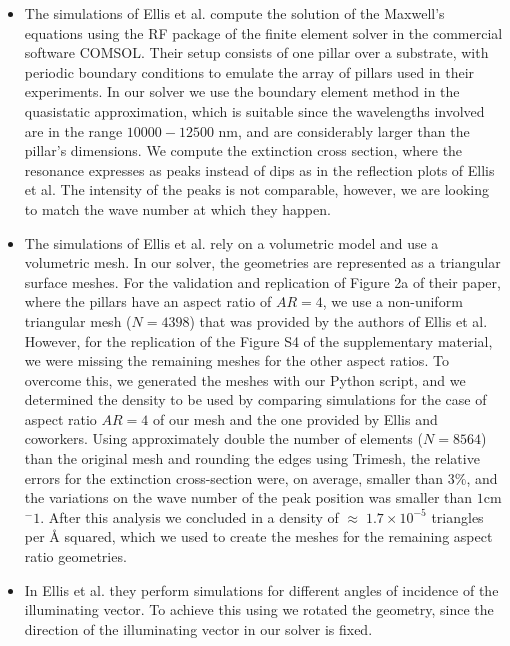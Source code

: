 \begin{itemize}

\item {The simulations of Ellis et al. compute the solution of the Maxwell's equations using the RF package
of the finite element solver in the commercial software COMSOL. Their setup consists of one pillar over a 
substrate, with periodic boundary conditions to emulate the array of pillars used in their experiments. In our 
solver we use the boundary element method in the quasistatic approximation, which is suitable since the wavelengths
involved are in the range $10000-12500$ nm, and are considerably larger than the pillar's dimensions. We compute 
the extinction cross section, where the resonance expresses as peaks instead of dips as in the reflection plots of 
Ellis et al. The intensity of the peaks is not comparable, however, we are looking to match the wave number at which
they happen.}

\item {The simulations of Ellis et al. rely on a volumetric model and use a volumetric mesh. In our 
solver, the geometries are represented as a triangular surface meshes. For the validation and replication of Figure 2a of 
their paper, where the pillars have an aspect ratio of $AR=4$, we use a non-uniform triangular mesh ($N=4398$) that 
was provided by the authors of Ellis et al. However, for the replication of the Figure S4 of the supplementary material, 
we were missing the remaining meshes for the other aspect ratios. To overcome this, we generated the meshes with our Python 
script, and we determined the density to be used by comparing simulations for the case of aspect ratio $AR=4$ of our mesh and 
the one provided by Ellis and coworkers. Using approximately double the number of elements ($N=8564$) than the original mesh 
and rounding the edges using Trimesh, the relative errors for the extinction cross-section were, on average, smaller than 
$3\%$, and the variations on the wave number of the peak position was smaller than $1$cm$^-1$. After this analysis we 
concluded in a density of $\approx \; 1.7 \times10^{-5}$ triangles per $\text{\AA}$ squared, which we used to create the meshes
for the remaining aspect ratio geometries.}

\item {In Ellis et al. they perform simulations for different angles of incidence of the illuminating vector. To achieve this 
using \pygbe we rotated the geometry, since the direction of the illuminating vector in our solver is fixed.}
\end{itemize}

